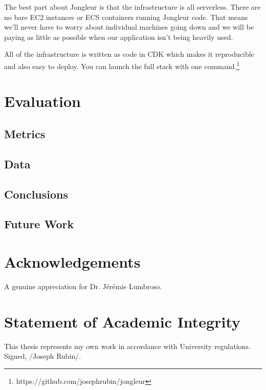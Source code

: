 \documentclass{article}
\begin{document}
The best part about Jongleur is that the infrastructure is all serverless.
There are no bare EC2 instances or ECS containers running Jongleur code.
That means we'll never have to worry about individual machines going down and we will be paying as little as possible when our application isn't being heavily used.

All of the infrastructure is written as code in CDK which makes it reproducible and also easy to deploy.
You can launch the full stack with one command.\footnote{https://github.com/josephrubin/jongleur}


\section{Evaluation}
\subsection{Metrics}
\subsection{Data}
\subsection{Conclusions}
\subsection{Future Work}

\section{Acknowledgements}

A genuine appreciation for Dr. Jérémie Lumbroso.

\section*{Statement of Academic Integrity}

This thesis represents my own work in accordance with University regulations.\\
Signed, /Joseph Rubin/.

\cite{tt}

%



\printindex
\end{document}
